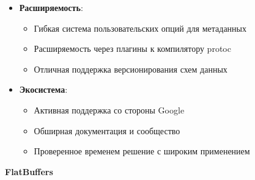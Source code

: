 \begin{itemize}
                \item \textbf{Расширяемость}:
                \begin{itemize}
                    \item Гибкая система пользовательских опций для метаданных
                    \item Расширяемость через плагины к компилятору protoc
                    \item Отличная поддержка версионирования схем данных
                \end{itemize}

                \item \textbf{Экосистема}:
                \begin{itemize}
                    \item Активная поддержка со стороны Google
                    \item Обширная документация и сообщество
                    \item Проверенное временем решение с широким применением
                \end{itemize}
            \end{itemize}

        \textbf{FlatBuffers}

